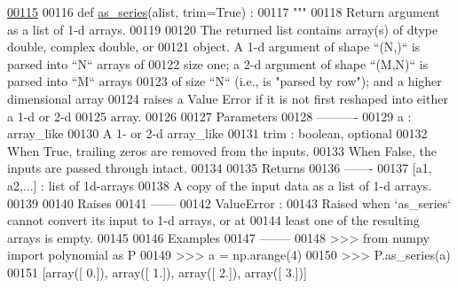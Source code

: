 \begin{DoxyCode}
\hypertarget{namespacepyneb_1_1utils_1_1polyutils_l00115}{}\hyperlink{namespacepyneb_1_1utils_1_1polyutils_a9c3751d438f0f75922155c7823fe2699}{00115} 
00116 \textcolor{keyword}{def }\hyperlink{namespacepyneb_1_1utils_1_1polyutils_a9c3751d438f0f75922155c7823fe2699}{as\_series}(alist, trim=True) :
00117     \textcolor{stringliteral}{"""}
00118 \textcolor{stringliteral}{    Return argument as a list of 1-d arrays.}
00119 \textcolor{stringliteral}{}
00120 \textcolor{stringliteral}{    The returned list contains array(s) of dtype double, complex double, or}
00121 \textcolor{stringliteral}{    object.  A 1-d argument of shape ``(N,)`` is parsed into ``N`` arrays of}
00122 \textcolor{stringliteral}{    size one; a 2-d argument of shape ``(M,N)`` is parsed into ``M`` arrays}
00123 \textcolor{stringliteral}{    of size ``N`` (i.e., is "parsed by row"); and a higher dimensional array}
00124 \textcolor{stringliteral}{    raises a Value Error if it is not first reshaped into either a 1-d or 2-d}
00125 \textcolor{stringliteral}{    array.}
00126 \textcolor{stringliteral}{}
00127 \textcolor{stringliteral}{    Parameters}
00128 \textcolor{stringliteral}{    ----------}
00129 \textcolor{stringliteral}{    a : array\_like}
00130 \textcolor{stringliteral}{        A 1- or 2-d array\_like}
00131 \textcolor{stringliteral}{    trim : boolean, optional}
00132 \textcolor{stringliteral}{        When True, trailing zeros are removed from the inputs.}
00133 \textcolor{stringliteral}{        When False, the inputs are passed through intact.}
00134 \textcolor{stringliteral}{}
00135 \textcolor{stringliteral}{    Returns}
00136 \textcolor{stringliteral}{    -------}
00137 \textcolor{stringliteral}{    [a1, a2,...] : list of 1d-arrays}
00138 \textcolor{stringliteral}{        A copy of the input data as a list of 1-d arrays.}
00139 \textcolor{stringliteral}{}
00140 \textcolor{stringliteral}{    Raises}
00141 \textcolor{stringliteral}{    ------}
00142 \textcolor{stringliteral}{    ValueError :}
00143 \textcolor{stringliteral}{        Raised when `as\_series` cannot convert its input to 1-d arrays, or at}
00144 \textcolor{stringliteral}{        least one of the resulting arrays is empty.}
00145 \textcolor{stringliteral}{}
00146 \textcolor{stringliteral}{    Examples}
00147 \textcolor{stringliteral}{    --------}
00148 \textcolor{stringliteral}{    >>> from numpy import polynomial as P}
00149 \textcolor{stringliteral}{    >>> a = np.arange(4)}
00150 \textcolor{stringliteral}{    >>> P.as\_series(a)}
00151 \textcolor{stringliteral}{    [array([ 0.]), array([ 1.]), array([ 2.]), array([ 3.])]}

\end{DoxyCode}
